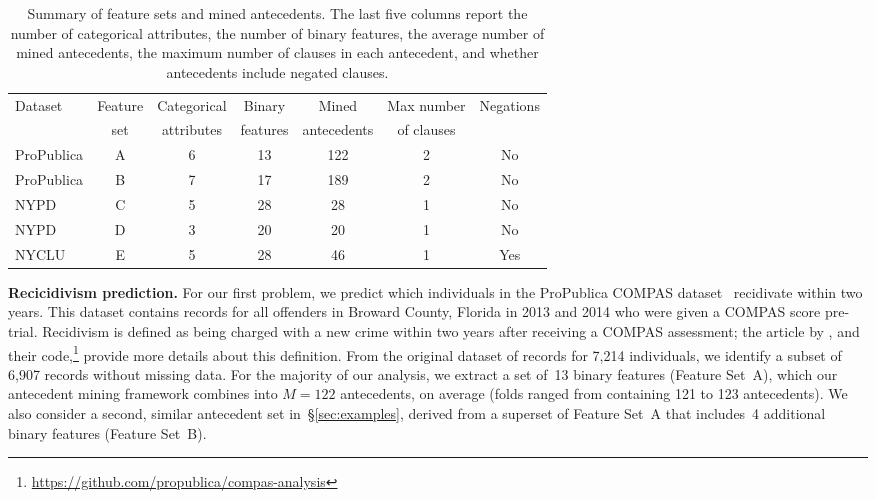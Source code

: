 \begin{table}[t!]
\centering
\begin{tabular}{l|c|c|c|c|c|c}
Dataset & Feature & Categorical & Binary & Mined & Max number & Negations \\
& set & attributes & features & antecedents & of clauses & \\
\hline
ProPublica & A & 6 & 13 & 122 & 2 & No \\
ProPublica & B & 7 & 17 & 189 & 2 & No \\
NYPD & C & 5 & 28 & 28 & 1 & No \\
NYPD & D & 3 & 20 & 20 & 1 & No \\
NYCLU & E & 5 & 28 & 46 & 1 & Yes
\end{tabular}
\caption{Summary of feature sets and mined antecedents.
%
The last five columns report the number of categorical attributes,
the number of binary features, the average number of mined antecedents,
the maximum number of clauses in each antecedent,
and whether antecedents include negated clauses.
}
\label{tab:features}
\end{table}

\textbf{Recicidivism prediction.}
For our first problem, we predict which individuals in the ProPublica COMPAS
dataset~\citep{LarsonMaKiAn16} recidivate within two years.
%
This dataset contains records for all offenders in Broward County, Florida
in 2013 and 2014 who were given a COMPAS score pre-trial.
%
Recidivism is defined as being charged with a new crime within two years
after receiving a COMPAS assessment; the article by \citet{LarsonMaKiAn16},
and their code,\footnote{\url{https://github.com/propublica/compas-analysis}}
provide more details about this definition.
%
From the original dataset of records for 7,214 individuals,
we identify a subset of 6,907 records without missing data.
%
For the majority of our analysis, we extract a set of~13 binary features (Feature Set~A),
which our antecedent mining framework combines into ${M=122}$ antecedents,
on average (folds ranged from containing 121 to 123 antecedents).
%
We also consider a second, similar antecedent set in~\S\ref{sec:examples},
derived from a superset of Feature Set~A that includes~4 additional binary features (Feature Set~B).

